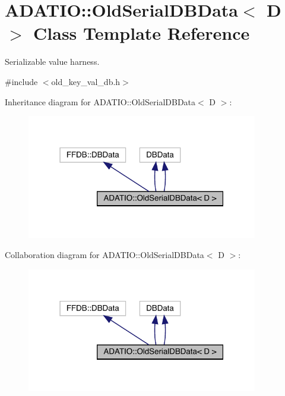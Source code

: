 \hypertarget{classADATIO_1_1OldSerialDBData}{}\section{A\+D\+A\+T\+IO\+:\+:Old\+Serial\+D\+B\+Data$<$ D $>$ Class Template Reference}
\label{classADATIO_1_1OldSerialDBData}


Serializable value harness.  




{\ttfamily \#include $<$old\+\_\+key\+\_\+val\+\_\+db.\+h$>$}



Inheritance diagram for A\+D\+A\+T\+IO\+:\+:Old\+Serial\+D\+B\+Data$<$ D $>$\+:
\nopagebreak
\begin{figure}[H]
\begin{center}
\leavevmode
\includegraphics[width=286pt]{de/d33/classADATIO_1_1OldSerialDBData__inherit__graph}
\end{center}
\end{figure}


Collaboration diagram for A\+D\+A\+T\+IO\+:\+:Old\+Serial\+D\+B\+Data$<$ D $>$\+:
\nopagebreak
\begin{figure}[H]
\begin{center}
\leavevmode
\includegraphics[width=286pt]{d4/d68/classADATIO_1_1OldSerialDBData__coll__graph}
\end{center}
\end{figure}
